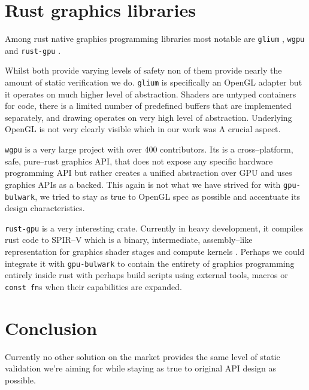 \section{Rust graphics libraries}

Among rust native graphics programming libraries most notable are \texttt{glium} \cite{gliumgithub}, \texttt{wgpu} \cite{wgpugithub} and \texttt{rust-gpu} \cite{rustgpugithub}.

Whilst both provide varying levels of safety non of them provide nearly the amount of static verification we do.
\texttt{glium} is specifically an OpenGL adapter but it operates on much higher level of abstraction.
Shaders are untyped containers for code, there is a limited number of predefined buffers that are implemented separately, 
and drawing operates on very high level of abstraction. Underlying OpenGL is not very clearly visible which in our work was A
crucial aspect.

\texttt{wgpu} is a very large project with over 400 contributors. Its is a cross--platform, safe, pure--rust graphics API, that
does not expose any specific hardware programming API but rather creates a unified abstraction over GPU and uses graphics APIs 
as a backed.
This again is not what we have strived for with \texttt{gpu-bulwark}, we tried to stay as true to OpenGL spec as possible
and accentuate its design characteristics.

\texttt{rust-gpu} is a very interesting crate. Currently in heavy development, it compiles rust code to SPIR--V which is a binary, intermediate, 
assembly--like representation for graphics shader stages and compute kernels \cite{spirvspec}.
Perhaps we could integrate it with \texttt{gpu-bulwark} to contain the entirety of graphics programming entirely inside rust 
with perhaps build scripts using external tools, macros or \texttt{const fn}s when their capabilities are expanded.

\section{Conclusion}

Currently no other solution on the market provides the same level of static validation we're aiming for
while staying as true to original API design as possible.
